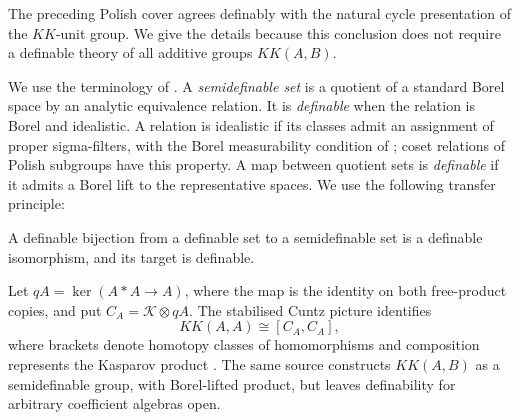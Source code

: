 The preceding Polish cover agrees definably with the natural cycle
presentation of the $KK$-unit group. We give the details because this
conclusion does not require a definable theory of all additive groups $KK(A,B)$.

We use the terminology of \cite[Sections 1.3--1.5]{LupiniDefinableKHomology2020}. A \emph{semidefinable set} is a quotient of a standard Borel space by an analytic
equivalence relation. It is \emph{definable} when the relation is Borel and
idealistic. A relation is idealistic if its classes admit an assignment of
proper sigma-filters, with the Borel measurability condition of \cite[Definition 1.6]{LupiniDefinableKHomology2020}; coset relations of Polish subgroups have this
property. A map between quotient sets is \emph{definable} if it admits a
Borel lift to the representative spaces. We use the following transfer
principle:

\begin{theorem}\label{thm:st-definable-transfer}
 A definable bijection from a definable set to
a semidefinable set is a definable isomorphism, and its target is definable.
\end{theorem}

Let $qA=\ker(A*A\to A)$, where the map is the identity on both free-product
copies, and put $C_A=\mathcal{K}\otimes qA$. The stabilised Cuntz picture
identifies 
\begin{equation}  \label{eq:st-cuntz-endomorphism}
KK(A,A)\cong[C_A,C_A],
\end{equation}
where brackets denote homotopy classes of homomorphisms and composition
represents the Kasparov product \cite[Section 5.6]{LupiniDefinableKHomology2020}. The same
source constructs $KK(A,B)$ as a semidefinable group, with Borel-lifted
product, but leaves definability for arbitrary coefficient algebras open.

